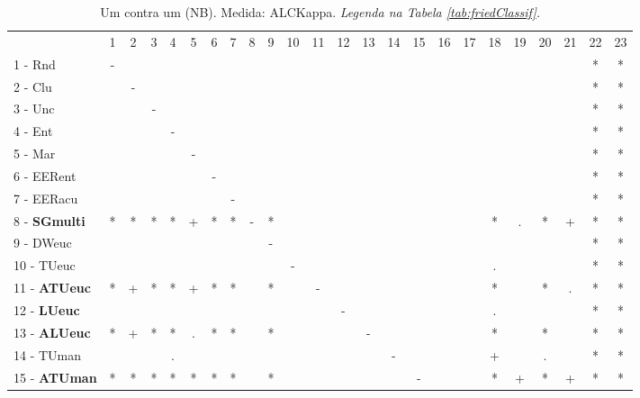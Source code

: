 \begin{table}[h]
\caption{Um contra um (NB). Medida: ALCKappa. \textit{Legenda na Tabela \ref{tab:friedClassif}.}}
\begin{center}\begin{tabular}{lcc|cc|cc|cc|cc|cc|cc|cc|cc|cc|cc|c}
 			& 1 & 2 & 3 & 4 & 5 & 6 & 7 & 8 & 9 & 10 & 11 & 12 & 13 & 14 & 15 & 16 & 17 & 18 & 19 & 20 & 21 & 22 & 23\\
1 - Rnd  	& - &   &   &   &   &   &   &   &   &   &   &   &   &   &   &   &   &   &   &   &   & * & * \\
2 - Clu  	&   & - &   &   &   &   &   &   &   &   &   &   &   &   &   &   &   &   &   &   &   & * & * \\ \hline
3 - Unc  	&   &   & - &   &   &   &   &   &   &   &   &   &   &   &   &   &   &   &   &   &   & * & * \\
4 - Ent  	&   &   &   & - &   &   &   &   &   &   &   &   &   &   &   &   &   &   &   &   &   & * & * \\ \hline
5 - Mar  	&   &   &   &   & - &   &   &   &   &   &   &   &   &   &   &   &   &   &   &   &   & * & * \\
6 - EERent	&   &   &   &   &   & - &   &   &   &   &   &   &   &   &   &   &   &   &   &   &   & * & * \\ \hline
7 - EERacu	&   &   &   &   &   &   & - &   &   &   &   &   &   &   &   &   &   &   &   &   &   & * & * \\
8 - \textbf{SGmulti}	& * & * & * & * & + & * & * & - & * &   &   &   &   &   &   &   &   & * & . & * & + & * & * \\ \hline
9 - DWeuc	&   &   &   &   &   &   &   &   & - &   &   &   &   &   &   &   &   &   &   &   &   & * & * \\
10 - TUeuc	&   &   &   &   &   &   &   &   &   & - &   &   &   &   &   &   &   & . &   &   &   & * & * \\ \hline
11 - \textbf{ATUeuc}	& * & + & * & * & + & * & * &   & * &   & - &   &   &   &   &   &   & * &   & * & . & * & * \\
12 - \textbf{LUeuc}	&   &   &   &   &   &   &   &   &   &   &   & - &   &   &   &   &   & . &   &   &   & * & * \\ \hline
13 - \textbf{ALUeuc}	& * & + & * & * & . & * & * &   & * &   &   &   & - &   &   &   &   & * &   & * &   & * & * \\
14 - TUman	&   &   &   & . &   &   &   &   &   &   &   &   &   & - &   &   &   & + &   & . &   & * & * \\ \hline
15 - \textbf{ATUman}	& * & * & * & * & * & * & * &   & * &   &   &   &   &   & - &   &   & * & + & * & + & * & * \\

\end{tabular}
\end{center}
\end{table}
